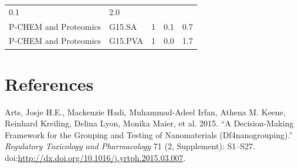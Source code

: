 \documentclass[utf8]{frontiersHLTH} %
\begin{document}
\begin{longtable}[]{@{}lllll@{}}
\begin{minipage}[t]{0.15\columnwidth}
0.1\strut
\end{minipage} & \begin{minipage}[t]{0.08\columnwidth}\raggedright\strut
2.0\strut
\end{minipage}\tabularnewline
\begin{minipage}[t]{0.26\columnwidth}\raggedright\strut
P-CHEM and Proteomics\strut
\end{minipage} & \begin{minipage}[t]{0.21\columnwidth}\raggedright\strut
G15.SA\strut
\end{minipage} & \begin{minipage}[t]{0.06\columnwidth}\raggedright\strut
1\strut
\end{minipage} & \begin{minipage}[t]{0.15\columnwidth}\raggedright\strut
0.1\strut
\end{minipage} & \begin{minipage}[t]{0.08\columnwidth}\raggedright\strut
0.7\strut
\end{minipage}\tabularnewline
\begin{minipage}[t]{0.26\columnwidth}\raggedright\strut
P-CHEM and Proteomics\strut
\end{minipage} & \begin{minipage}[t]{0.21\columnwidth}\raggedright\strut
G15.PVA\strut
\end{minipage} & \begin{minipage}[t]{0.06\columnwidth}\raggedright\strut
1\strut
\end{minipage} & \begin{minipage}[t]{0.15\columnwidth}\raggedright\strut
0.0\strut
\end{minipage} & \begin{minipage}[t]{0.08\columnwidth}\raggedright\strut
1.7\strut
\end{minipage}\tabularnewline
\bottomrule
\end{longtable}

\section*{References}\label{references}

\hypertarget{refs}{}
\hypertarget{ref-Arts15}{}
Arts, Josje H.E., Mackenzie Hadi, Muhammad-Adeel Irfan, Athena M. Keene,
Reinhard Kreiling, Delina Lyon, Monika Maier, et al. 2015. ``A
Decision-Making Framework for the Grouping and Testing of Nanomaterials
(Df4nanogrouping).'' \emph{Regulatory Toxicology and Pharmacology} 71
(2, Supplement): S1--S27.
doi:\href{https://doi.org/http://dx.doi.org/10.1016/j.yrtph.2015.03.007}{http://dx.doi.org/10.1016/j.yrtph.2015.03.007}.
\end{document}
